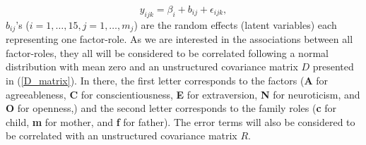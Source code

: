\documentclass[11pt,a5paper,twoside]{book}
\begin{document}
\begin{equation}
\label{main_model}
y_{ijk}=\beta_i + b_{ij} + \epsilon_{ijk},
\end{equation}
$b_{ij}$'s ($i=1,\ldots,15, j=1,\ldots,m_j$) are the random effects (latent variables) each representing one factor-role. As we are interested in the associations between all factor-roles, they all will be considered to be correlated following a normal distribution with mean zero and an unstructured covariance matrix $D$ presented in (\ref{D_matrix}). In there, the first letter corresponds to the factors (\textbf{A} for agreeableness, \textbf{C} for conscientiousness, \textbf{E} for extraversion, \textbf{N} for neuroticism, and \textbf{O} for openness,) and the second letter corresponds to the family roles (\textbf{c} for child, \textbf{m} for mother, and \textbf{f} for father). The error terms will also be considered to be correlated with an unstructured covariance matrix $R$. 
\end{document}
